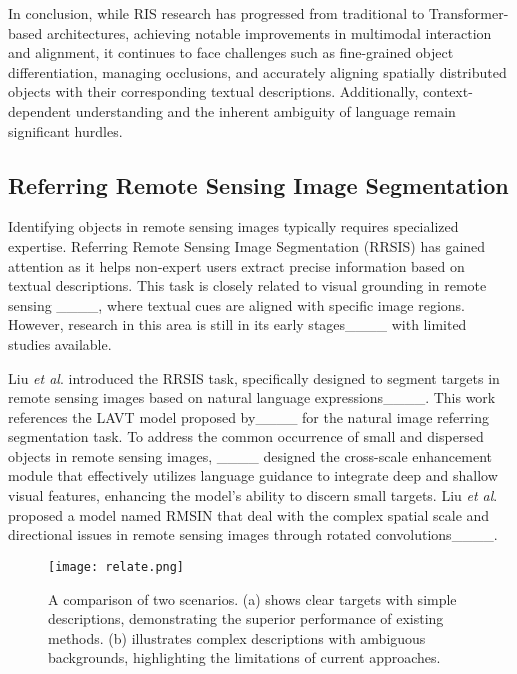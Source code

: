 In conclusion, while RIS research has progressed from traditional to Transformer-based architectures, achieving notable improvements in multimodal interaction and alignment, it continues to face challenges such as fine-grained object differentiation, managing occlusions, and accurately aligning spatially distributed objects with their corresponding textual descriptions. Additionally, context-dependent understanding and the inherent ambiguity of language remain significant hurdles.

\subsection{Referring Remote Sensing Image Segmentation}
Identifying objects in remote sensing images typically requires specialized expertise. Referring Remote Sensing Image Segmentation (RRSIS) has gained attention as it helps non-expert users extract precise information based on textual descriptions. This task is closely related to visual grounding in remote sensing ____, where textual cues are aligned with specific image regions. However, research in this area is still in its early stages____ with limited studies available. 

Liu \textit{et al}. introduced the RRSIS task, specifically designed to segment targets in remote sensing images based on natural language expressions____. This work references the LAVT model proposed by____ for the natural image referring segmentation task. To address the common occurrence of small and dispersed objects in remote sensing images, ____ designed the cross-scale enhancement module that effectively utilizes language guidance to integrate deep and shallow visual features, enhancing the model's ability to discern small targets. Liu \textit{et al}. proposed a model named RMSIN that deal with the complex spatial scale and directional issues in remote sensing images through rotated convolutions____.
\begin{figure}
    \centering
    \texttt{[image: relate.png]}
    \vspace{-5mm}
    \caption{A comparison of two scenarios. (a) shows clear targets with simple descriptions, demonstrating the superior performance of existing methods. (b) illustrates complex descriptions with ambiguous backgrounds, highlighting the limitations of current approaches. }
    \label{fig:relate}
    
\end{figure}

